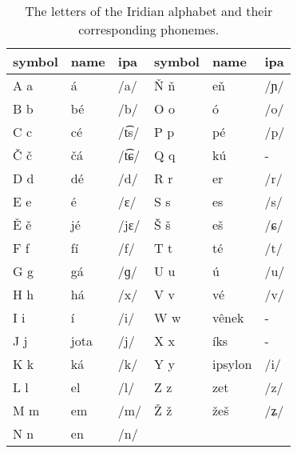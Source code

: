 \begin{table}
	\footnotesize\sffamily
 	\caption{The letters of the Iridian alphabet and their corresponding phonemes.}
	\medskip
	\begin{tabu}to 0.9 
		\toprule
		{{\sc  symbol}} & {\sc name} & {\sc ipa} & {{\sc  symbol}} 	& {\sc name}& {\sc ipa}\\
		\midrule
		A a	  			& á 		 & /a/       &  Ň ň				& eň 		& /ɲ/\\
		B b				& bé		 & /b/       &  O o				& ó			& /o/\\
		C c				& cé		 & /t͡s/      &  P p			 & pé		 & /p/\\
		Č č				& čá		 & /t͡ɕ/      &  Q q			 & kú		 & -\\
		D d				& dé		 & /d/       &  R r			 	& er		& /r/\\
		E e				& é		 	 & /ɛ/       &  S s				& es		& /s/\\
		Ě ě				& jé		 & /jɛ/      &  Š š				& eš		& /ɕ/\\
		F f				& fí		 & /f/       &  T t				& té		& /t/\\
		G g				& gá		 & /ɡ/       &  U u				& ú			& /u/\\
		H h				& há		 & /x/       &  V v				& vé		& /v/\\
		I i				& í		 	 & /i/       &  W w				& vênek		& -\\
		J j				& jota		 & /j/       &  X x				& íks		& -\\
		K k				& ká		 & /k/       &  Y y				& ipsylon   & /i/\\
		L l				& el		 & /l/       &  Z z				& zet		& /z/\\
		M m				& em		 & /m/       &  Ž ž				& žeš		& /ʑ/\\
		N n				& en		 & /n/       &    				& 			& \\
		\bottomrule
	\end{tabu}
\end{table}


